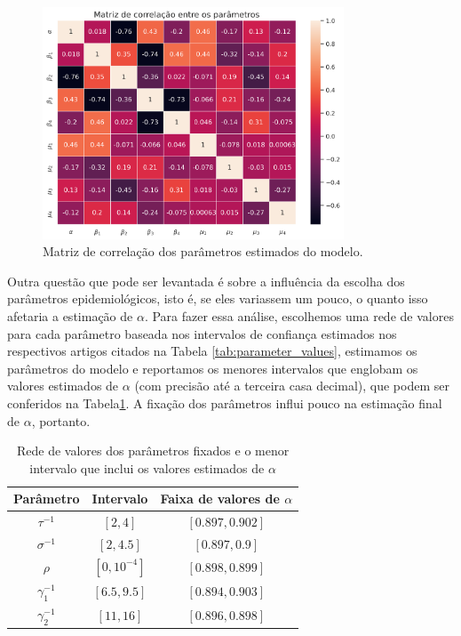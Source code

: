 \begin{figure}[!hb]
    \centering
    \includegraphics[width=0.8\textwidth]{../images/correlation_matrix.png}
    \caption{Matriz de correlação dos parâmetros estimados do modelo.}
    \label{fig:corr-matrix}
\end{figure}

Outra questão que pode ser levantada é sobre a influência da escolha dos parâmetros epidemiológicos, isto é, se eles variassem um pouco, o quanto isso afetaria a estimação de $\alpha$. 
Para fazer essa análise, escolhemos uma rede de valores para cada parâmetro baseada nos intervalos de confiança estimados nos respectivos artigos citados na Tabela \ref{tab:parameter_values}, estimamos os parâmetros do modelo e reportamos os menores intervalos que englobam os
valores estimados de $\alpha$ (com precisão até a terceira casa decimal), que podem ser conferidos na Tabela\ref{tab:range-parameters}. 
A fixação dos parâmetros influi pouco na estimação final de $\alpha$, portanto. 

\begin{table}[!hb]
    \centering
    \begin{tabular}{|c|c|c|}
    \hline
    \textbf{Parâmetro} & \textbf{Intervalo} & \textbf{Faixa de valores de $\alpha$} \\ \hline
    $\tau^{-1}$        & $[2,4]$            & $[0.897,0.902]$                       \\ \hline
    $\sigma^{-1}$      & $[2,4.5]$          & $[0.897, 0.9]$                         \\ \hline
    $\rho$             & $[0,10^{-4}]$      & $[0.898, 0.899]$                               \\ \hline
    $\gamma_1^{-1}$    & $[6.5,9.5]$        & $[0.894, 0.903]$                       \\ \hline
    $\gamma_2^{-1}$    & $[11,16]$          & $[0.896, 0.898]$                       \\ \hline
    \end{tabular}
    \caption{Rede de valores dos parâmetros fixados e o menor intervalo que inclui os valores estimados de $\alpha$}
    \label{tab:range-parameters}
\end{table}